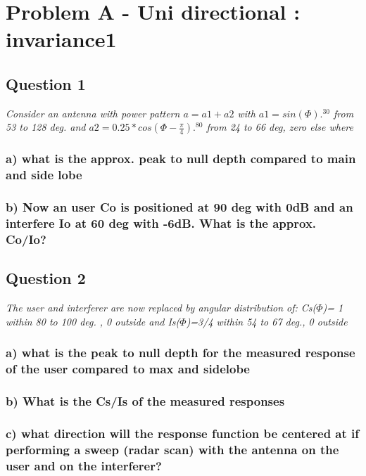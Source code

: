 \section{Problem A - Uni directional : invariance1} \label{sec:mm4_PbA}

\subsection{Question 1}
\textit{Consider an antenna with power pattern $a=a1+a2$ with $a1=sin(\Phi).^{30}$ from 53 to 128 deg. and $a2=0.25*cos(\Phi - \frac{\pi}{4}).^{80}$ from 24 to 66 deg, zero else where}

\subsubsection{a) what is the approx. peak to null depth compared to main and side lobe}


\subsubsection{b) Now an user Co is positioned at 90 deg with 0dB and an interfere Io at 60 deg with -6dB. What is the approx. Co/Io?}


\subsection{Question 2}
\textit{The user and interferer are now replaced by angular distribution of: Cs($\Phi$)= 1 within 80 to 100 deg. , 0 outside and Is($\Phi$)=3/4 within 54 to 67 deg., 0 outside}

\subsubsection{a) what is the peak to null depth for the measured response of the user compared to max and sidelobe}


\subsubsection{b) What is the Cs/Is of the measured responses}

\subsubsection{c) what direction will the response function be centered at if performing a sweep (radar scan) with the antenna on the user and on the interferer?}